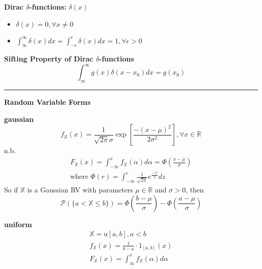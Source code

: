 \documentclass{article}
\renewcommand{\P}{\mathcal{P}}
\providecommand{\X}{\mathbb{X}}
\providecommand{\R}{\mathbb{R}}
\begin{document}
\begin{multicols*}{3}
        \textbf{Dirac $\delta$-functions:} $\delta(x)$

        \begin{itemize}
            \item $\delta(x)=0,\forall x\neq0$
            \item $\int_{\infty}^{\infty} \delta(x)dx=\int_{-\epsilon}^{\epsilon}\delta(x)dx=1,\forall\epsilon>0 $
        \end{itemize}

        \textbf{Sifting Property of Dirac $\delta$-functions}
        \begin{equation*}
            \int_{\infty}^{\infty} g(x)\delta(x-x_0)dx=g(x_0)
        \end{equation*}

        \noindent\rule{\columnwidth}{0.4pt}

        \textbf{Random Variable Forms}

        \textbf{gaussian}
        \begin{equation*}
            f_\X(x)=\frac{1}{\sqrt{2\pi}\sigma}\exp[\frac{-(x-\mu)^2}{2\sigma^2}],\forall x\in\R
        \end{equation*}
        n.b.
        \begin{equation*}
            \begin{gathered}
                F_\X(x)=\int_{-\infty}^{x}f_{\X}(\alpha)d\alpha=\Phi(\frac{x-\mu}{\sigma})\\
                \text{where } \Phi(r)=\int_{-\infty}^{r} \frac{1}{\sqrt{2\pi}}e^{\frac{-z^2}{2}}dz
            \end{gathered}
        \end{equation*}
        So if $\X$ is a Gaussian RV with parameters $\mu\in\R$ and $\sigma>0$, then
        \begin{equation*}
            \P(\{a<\X\leq b\}) = \Phi(\frac{b-\mu}{\sigma}) - \Phi(\frac{a-\mu}{\sigma})
        \end{equation*}

        \textbf{uniform}
        \begin{equation*}
            \begin{gathered}
                \X=\text{u}[a,b], a<b\\
                f_\X(x)=\frac{1}{b-a}\cdot 1_{[a,b]}(x)\\
                F_{\X}(x)=\int_{\infty}^{x} f_{\X}(\alpha)d\alpha
            \end{gathered}
        \end{equation*}


\end{multicols*}
\end{document}
